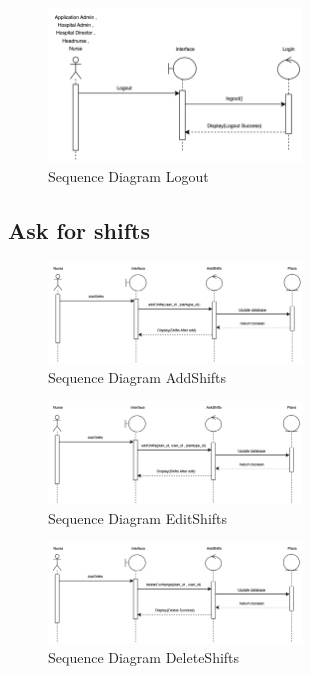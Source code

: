 \begin{figure}[h]
    \centering
    \includegraphics[width=0.6\textwidth]{Sequence 1.3.png}
    \caption{Sequence Diagram Logout}
    \end{figure}


\subsection{Ask for shifts}

    \begin{figure}[h]
    \centering
    \includegraphics[width=0.6\textwidth]{Sequence 2.1.png}
    \caption{Sequence Diagram AddShifts}
    \end{figure}

    \begin{figure}[h]
    \centering
    \includegraphics[width=0.6\textwidth]{Sequence 2.2.png}
    \caption{Sequence Diagram EditShifts}
    \end{figure}

    \begin{figure}[h]
    \centering
    \includegraphics[width=0.6\textwidth]{Sequence 2.3.png}
    \caption{Sequence Diagram DeleteShifts}
    \end{figure}


